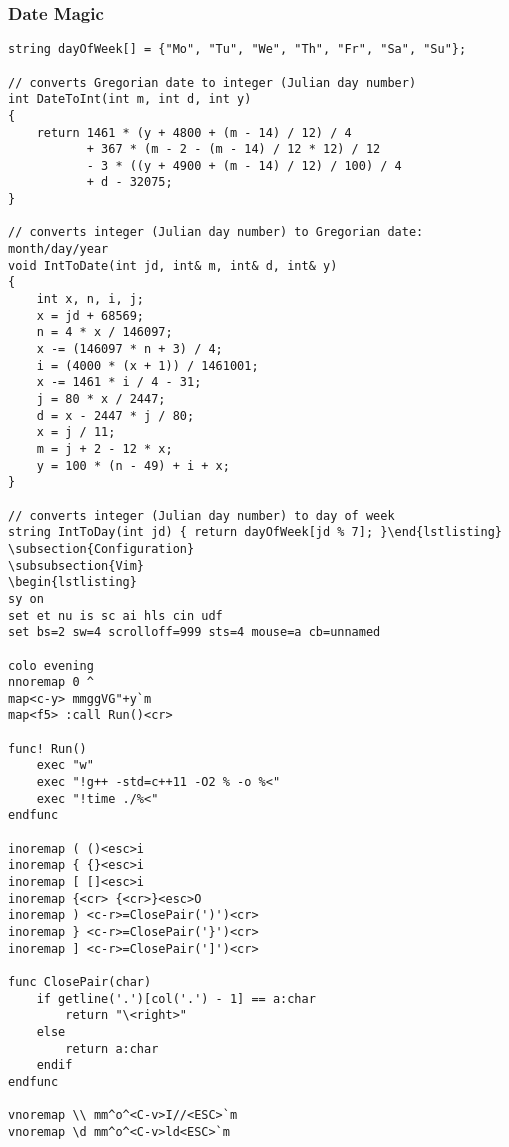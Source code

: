 \documentclass[twoside]{article}
\begin{document}
\subsubsection{Date Magic}
\begin{lstlisting}
string dayOfWeek[] = {"Mo", "Tu", "We", "Th", "Fr", "Sa", "Su"};

// converts Gregorian date to integer (Julian day number)
int DateToInt(int m, int d, int y)
{
    return 1461 * (y + 4800 + (m - 14) / 12) / 4
           + 367 * (m - 2 - (m - 14) / 12 * 12) / 12
           - 3 * ((y + 4900 + (m - 14) / 12) / 100) / 4
           + d - 32075;
}

// converts integer (Julian day number) to Gregorian date: month/day/year
void IntToDate(int jd, int& m, int& d, int& y)
{
    int x, n, i, j;
    x = jd + 68569;
    n = 4 * x / 146097;
    x -= (146097 * n + 3) / 4;
    i = (4000 * (x + 1)) / 1461001;
    x -= 1461 * i / 4 - 31;
    j = 80 * x / 2447;
    d = x - 2447 * j / 80;
    x = j / 11;
    m = j + 2 - 12 * x;
    y = 100 * (n - 49) + i + x;
}

// converts integer (Julian day number) to day of week
string IntToDay(int jd) { return dayOfWeek[jd % 7]; }\end{lstlisting}
\subsection{Configuration}
\subsubsection{Vim}
\begin{lstlisting}
sy on
set et nu is sc ai hls cin udf
set bs=2 sw=4 scrolloff=999 sts=4 mouse=a cb=unnamed

colo evening
nnoremap 0 ^
map<c-y> mmggVG"+y`m
map<f5> :call Run()<cr>

func! Run()
    exec "w"
    exec "!g++ -std=c++11 -O2 % -o %<"
    exec "!time ./%<"
endfunc

inoremap ( ()<esc>i
inoremap { {}<esc>i
inoremap [ []<esc>i
inoremap {<cr> {<cr>}<esc>O
inoremap ) <c-r>=ClosePair(')')<cr>
inoremap } <c-r>=ClosePair('}')<cr>
inoremap ] <c-r>=ClosePair(']')<cr>

func ClosePair(char)
    if getline('.')[col('.') - 1] == a:char
        return "\<right>"
    else
        return a:char
    endif
endfunc

vnoremap \\ mm^o^<C-v>I//<ESC>`m
vnoremap \d mm^o^<C-v>ld<ESC>`m
\end{lstlisting}
\end{document}

